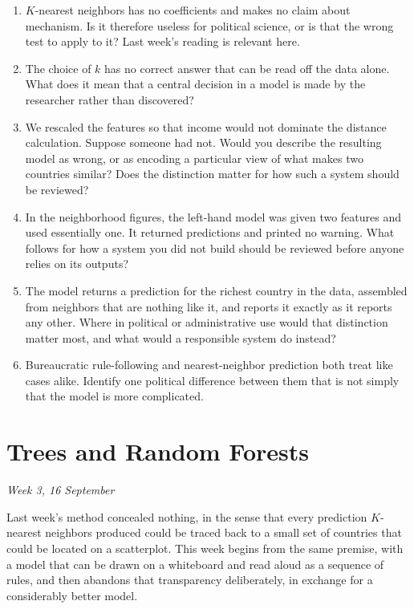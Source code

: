 \documentclass[
  a4paper,
]{scrbook}
\begin{document}
\begin{enumerate}
\def\labelenumi{\arabic{enumi}.}
\item
  \(K\)-nearest neighbors has no coefficients and makes no claim about
  mechanism. Is it therefore useless for political science, or is that
  the wrong test to apply to it? Last week's reading is relevant here.
\item
  The choice of \(k\) has no correct answer that can be read off the
  data alone. What does it mean that a central decision in a model is
  made by the researcher rather than discovered?
\item
  We rescaled the features so that income would not dominate the
  distance calculation. Suppose someone had not. Would you describe the
  resulting model as wrong, or as encoding a particular view of what
  makes two countries similar? Does the distinction matter for how such
  a system should be reviewed?
\item
  In the neighborhood figures, the left-hand model was given two
  features and used essentially one. It returned predictions and printed
  no warning. What follows for how a system you did not build should be
  reviewed before anyone relies on its outputs?
\item
  The model returns a prediction for the richest country in the data,
  assembled from neighbors that are nothing like it, and reports it
  exactly as it reports any other. Where in political or administrative
  use would that distinction matter most, and what would a responsible
  system do instead?
\item
  Bureaucratic rule-following and nearest-neighbor prediction both treat
  like cases alike. Identify one political difference between them that
  is not simply that the model is more complicated.
\end{enumerate}

\chapter{Trees and Random Forests}\label{trees-and-random-forests}

\emph{Week 3, 16 September}

Last week's method concealed nothing, in the sense that every prediction
\(K\)-nearest neighbors produced could be traced back to a small set of
countries that could be located on a scatterplot. This week begins from
the same premise, with a model that can be drawn on a whiteboard and
read aloud as a sequence of rules, and then abandons that transparency
deliberately, in exchange for a considerably better model.
\end{document}
